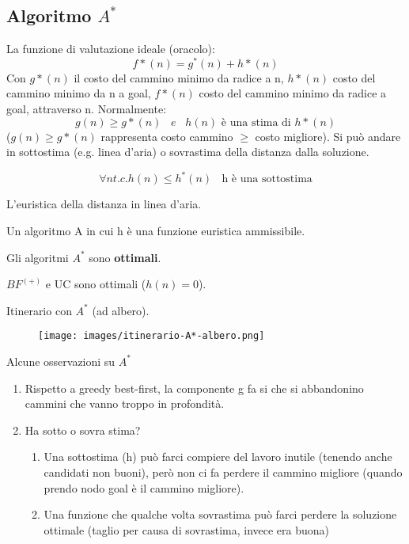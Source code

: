 \subsection{Algoritmo $A^*$}
La funzione di valutazione ideale (oracolo):
$$f*(n) = g^*(n) + h*(n)$$
Con $g*(n)$ il costo del cammino minimo da radice a n, $h*(n)$ costo del cammino minimo da n a goal, $f*(n)$ costo
del cammino minimo da radice a goal, attraverso n. Normalmente:
$$g(n) \geq g*(n) \hspace{10pt} e \hspace{10pt} h(n) \text{ è una stima di } h*(n)$$
($g(n) \geq g*(n)$ rappresenta costo cammino $\geq$ costo migliore). Si può andare in sottostima (e.g. linea d'aria) o 
sovrastima della distanza dalla soluzione.
\begin{definition}
    $$\forall n t.c. h(n) \leq h^*(n) \:\:\:\: \text{h è una sottostima}$$
\end{definition}
\begin{example}
    L'euristica della distanza in linea d'aria.
\end{example}
\begin{definition}[Algoritmo $A^*$]
    Un algoritmo A in cui h è una funzione euristica ammissibile.
\end{definition}
\begin{theorem}
    Gli algoritmi $A^*$ sono \textbf{ottimali}.
\end{theorem}
\begin{corollaries}
    $BF^{(+)}$ e UC sono ottimali ($h(n) = 0$).
\end{corollaries}
\begin{example}
    Itinerario con $A^*$ (ad albero).
    \begin{figure}[h!]
        \centering
        \texttt{[image: images/itinerario-A*-albero.png]}
    \end{figure}
\end{example}
\begin{observation}
    Alcune osservazioni su $A^*$
    \begin{enumerate}
        \item Rispetto a greedy best-first, la componente g fa si che si abbandonino cammini che vanno troppo in profondità.
        \item Ha sotto o sovra stima?
        \begin{enumerate}
            \item Una sottostima (h) può farci compiere del lavoro inutile (tenendo anche candidati non buoni), però non ci 
            fa perdere il cammino migliore (quando prendo nodo goal è il cammino migliore).
            \item Una funzione che qualche volta sovrastima può farci perdere la soluzione ottimale (taglio per causa di sovrastima, invece era buona)
        \end{enumerate}
    \end{enumerate}
\end{observation}

